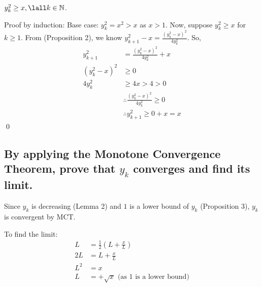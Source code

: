 \documentclass[10pt, letterpaper, titlepage]{article}
\begin{document}
        \begin{proposition}
          $y_k^2 \geq x, \lall k \in \N$.
        \end{proposition}
          Proof by induction: 
          Base case: $y_k^2 = x^2 > x$ as $x > 1$.
          Now, suppose $y_k^2 \geq x$ for $k \geq 1$.
          From (Proposition 2), we know $y_{k+1}^2 - x = \frac{(y_k^2 - x)^2}{4y_k^2}$. 
          So, 
          \begin{align*}
            y_{k+1}^2 &= \frac{(y_k^2 - x)^2}{4y_k^2} + x \\
            (y_k^2 - x)^2 &\geq 0 \\
            4y_k^2 &\geq 4x > 4 > 0 \\
            &\therefore \frac{(y_k^2 - x)^2}{4y_k^2} \geq 0 \\
            &\therefore y_{k+1}^2 \geq 0 + x = x 
          \end{align*}
          \qed

      \subsection{By applying the Monotone Convergence Theorem, prove that $y_k$ converges and find its limit.}
        Since $y_k$ is decreasing (Lemma 2) 
        and $1$ is a lower bound of $y_k$ (Proposition 3), 
        $y_k$ is convergent by MCT.

        To find the limit:
        \begin{align*}
          L &= \frac{1}{2} (L + \frac{x}{L})\\
          2L &= L + \frac{x}{L}\\
          L^2 &= x \\
          L &= + \sqrt{x} \text{\ \ (as $1$ is a lower bound)}
        \end{align*}

\end{document}
